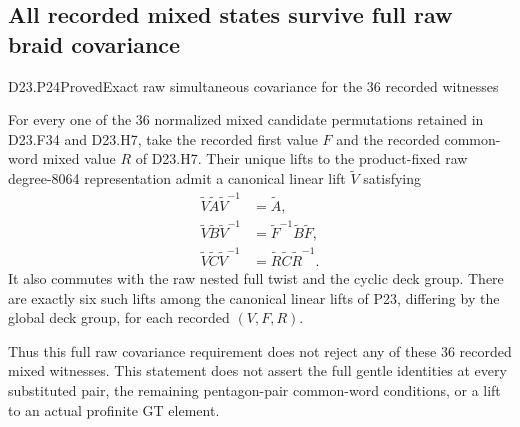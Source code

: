 \subsection{All recorded mixed states survive full raw braid covariance}

\begin{statement}{D23.P24}{Proved}{Exact raw simultaneous covariance for the 36 recorded witnesses}
\end{statement}
For every one of the 36 normalized mixed candidate
permutations retained in D23.F34 and D23.H7, take the
recorded first value $F$ and the recorded common-word
mixed value $R$ of D23.H7. Their unique lifts to the
product-fixed raw degree-8064 representation admit a
canonical linear lift $\widetilde V$ satisfying
\[
\begin{split}
 \widetilde V\widetilde A\widetilde V^{-1}
     &=\widetilde A,\\
 \widetilde V\widetilde B\widetilde V^{-1}
     &=\widetilde F^{-1}\widetilde B\widetilde F,\\
 \widetilde V\widetilde C\widetilde V^{-1}
     &=\widetilde R\widetilde C\widetilde R^{-1}.
\end{split}                                                \tag{D23.P24.1}
\]
It also commutes with the raw nested full twist and the
cyclic deck group. There are exactly six such lifts among
the canonical linear lifts of P23, differing by the global
deck group, for each recorded $(V,F,R)$.

Thus this full raw covariance requirement does not reject
any of these 36 recorded mixed witnesses. This statement
does not assert the full gentle identities at every
substituted pair, the remaining pentagon-pair common-word
conditions, or a lift to an actual profinite GT element.

